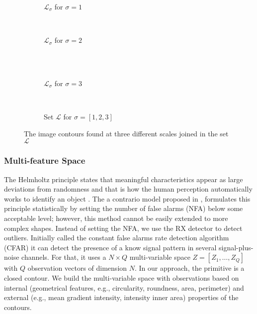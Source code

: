 \begin{figure}[!ht]
    \centering
    \begin{subfigure}[b]{0.3\textwidth}
        \caption{$\mathcal{L}_{\sigma}$ for $\sigma=1$}
        \label{fig:cnts_scale1}
    \end{subfigure}
    ~ %
    \begin{subfigure}[b]{0.3\textwidth}
        \caption{$\mathcal{L}_{\sigma}$ for $\sigma=2$}
        \label{fig:cnts_scale2}
    \end{subfigure}\\
        ~ %
    \begin{subfigure}[b]{0.3\textwidth}
        \caption{$\mathcal{L}_{\sigma}$ for $\sigma=3$}
        \label{fig:cnts_scale3}
    \end{subfigure}
        ~ %
    \begin{subfigure}[b]{0.3\textwidth}
        \caption{Set $\mathcal{L}$ for $\sigma=[1, 2 ,3]$}
        \label{fig:all_cnts}
    \end{subfigure}
    \caption{The image contours found at three different scales joined in the set $\mathcal{L}$}\label{fig:multiscale_cnts}
\end{figure}

\subsubsection{Multi-feature Space}\label{subsec:multispace}
The Helmholtz principle states that meaningful characteristics appear as large deviations from randomness and that is how the human perception automatically works to identify an object \citep{Attneave:PR:1954}. The a contrario model proposed in \citep{Desolneux.Moisan.ea:Gestalt:2008}, formulates this principle statistically by setting the number of false alarms (NFA) below some acceptable level; however, this method cannot be easily extended to more complex shapes. Instead of setting the NFA, we use the RX detector \citep{Reed.Yu:TASSP:1990} to detect outliers. Initially called the constant false alarms rate detection algorithm (CFAR) it can detect the presence of a know signal pattern in several signal-plus-noise channels. For that, it uses a $N\times Q$ multi-variable space $Z=[Z_{1}, \ldots, Z_{Q}]$ with $Q$  observation vectors of dimension $N$. In our approach, the primitive is a closed contour. We build the multi-variable space with observations based on internal (geometrical features, e.g., circularity, roundness, area, perimeter) and external (e.g., mean gradient intensity,  intensity inner area) properties of the contours.

